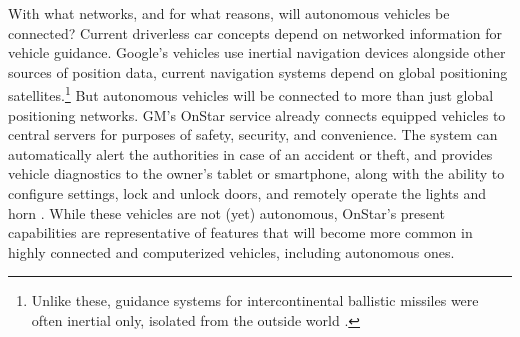With what networks, and for what reasons, will autonomous vehicles be
connected? Current driverless car concepts depend on networked
information for vehicle guidance.
Google's vehicles use inertial navigation devices \cite{knightFurther}
alongside other sources of position data, current navigation systems
depend on global positioning satellites.\footnote{Unlike these,
guidance systems for intercontinental ballistic
missiles were often inertial only, isolated from the outside world
\cite{mackenzie}.} But autonomous
vehicles will be connected to more than just global positioning
networks. GM's OnStar service already connects equipped vehicles to central servers for
purposes of safety, security, and convenience. The system can
automatically alert the authorities in case of an accident 
or theft, and provides vehicle diagnostics to the owner's tablet
or smartphone, along with the ability to
configure settings, lock and 
unlock doors, and remotely operate the lights and horn \cite{onstar}.
While these vehicles are not (yet) autonomous, OnStar's present
capabilities are representative of features that will become more common in highly
connected and computerized vehicles, including autonomous ones.



